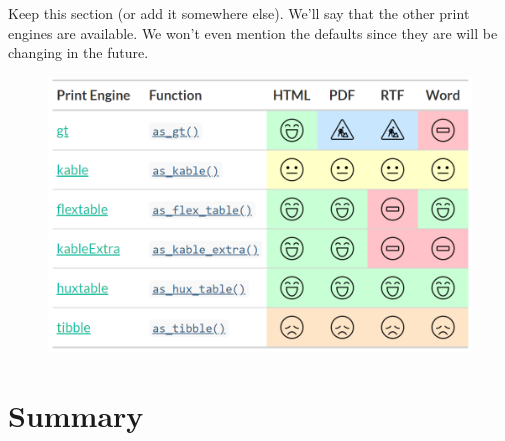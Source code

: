 Keep this section (or add it somewhere else).  We'll say that the other print engines are available. We won't even mention the defaults since they are will be changing in the future.

\begin{figure}[h!]
  \includegraphics[scale=0.28]{print_engines.png}
  \centering
\end{figure}

\section{Summary}



\address{Daniel D. Sjoberg\\
  Memorial Sloan Kettering Cancer Center\\
  1275 York Ave., New York, New York 10022\\
  USA\\
  ORCiD: 0000-0003-0862-2018\\
  }

\address{Karissa Whiting\\
  Memorial Sloan Kettering Cancer Center\\
  1275 York Ave., New York, New York 10022\\
  USA\\
  ORCiD: 0000-0002-4683-1868\\
  }

\address{Michael Curry\\
  Memorial Sloan Kettering Cancer Center\\
  1275 York Ave., New York, New York 10022\\
  USA\\
  ORCiD: 0000-0002-0261-4044\\
  }
